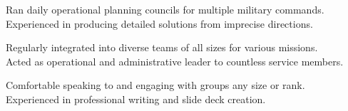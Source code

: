 Ran daily operational planning councils for multiple military commands. \\
Experienced in producing detailed solutions from imprecise directions.\\
\sectionsep

Regularly integrated into diverse teams of all sizes for various missions. \\
Acted as operational and administrative leader to countless service members. \\
\sectionsep

Comfortable speaking to and engaging with groups any size or rank. \\
Experienced in professional writing and slide deck creation. \\
\sectionsep
